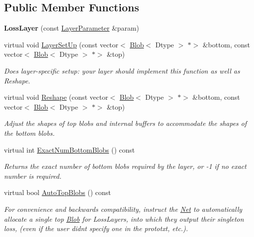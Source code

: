 \subsection*{Public Member Functions}
\begin{DoxyCompactItemize}
\item 
\mbox{\label{classcaffe_1_1_loss_layer_a16e133050e2d97c6f024ea74e3ba4ead}} 
{\bfseries Loss\+Layer} (const \mbox{\hyperlink{classcaffe_1_1_layer_parameter}{Layer\+Parameter}} \&param)
\item 
virtual void \mbox{\hyperlink{classcaffe_1_1_loss_layer_aa6fc7c2e90be66f1c1f0683637c949da}{Layer\+Set\+Up}} (const vector$<$ \mbox{\hyperlink{classcaffe_1_1_blob}{Blob}}$<$ Dtype $>$ $\ast$$>$ \&bottom, const vector$<$ \mbox{\hyperlink{classcaffe_1_1_blob}{Blob}}$<$ Dtype $>$ $\ast$$>$ \&top)
\begin{DoxyCompactList}\small\item\em Does layer-\/specific setup\+: your layer should implement this function as well as Reshape. \end{DoxyCompactList}\item 
virtual void \mbox{\hyperlink{classcaffe_1_1_loss_layer_abf00412194f5413ea9468ee44b0d986f}{Reshape}} (const vector$<$ \mbox{\hyperlink{classcaffe_1_1_blob}{Blob}}$<$ Dtype $>$ $\ast$$>$ \&bottom, const vector$<$ \mbox{\hyperlink{classcaffe_1_1_blob}{Blob}}$<$ Dtype $>$ $\ast$$>$ \&top)
\begin{DoxyCompactList}\small\item\em Adjust the shapes of top blobs and internal buffers to accommodate the shapes of the bottom blobs. \end{DoxyCompactList}\item 
virtual int \mbox{\hyperlink{classcaffe_1_1_loss_layer_af1620064baefb711e2c767bdc92b6fb1}{Exact\+Num\+Bottom\+Blobs}} () const
\begin{DoxyCompactList}\small\item\em Returns the exact number of bottom blobs required by the layer, or -\/1 if no exact number is required. \end{DoxyCompactList}\item 
\mbox{\label{classcaffe_1_1_loss_layer_ae98a9942cdb1c67e09d45cc2d876618e}} 
virtual bool \mbox{\hyperlink{classcaffe_1_1_loss_layer_ae98a9942cdb1c67e09d45cc2d876618e}{Auto\+Top\+Blobs}} () const
\begin{DoxyCompactList}\small\item\em For convenience and backwards compatibility, instruct the \mbox{\hyperlink{classcaffe_1_1_net}{Net}} to automatically allocate a single top \mbox{\hyperlink{classcaffe_1_1_blob}{Blob}} for Loss\+Layers, into which they output their singleton loss, (even if the user didn\textquotesingle{}t specify one in the prototxt, etc.). \end{DoxyCompactList}\item 

\end{DoxyCompactItemize}
